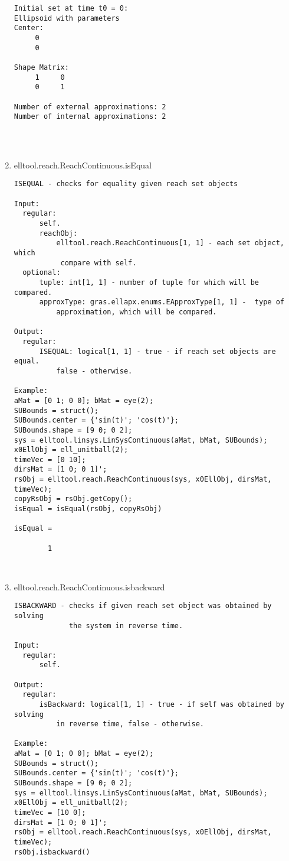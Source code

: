 \begin{enumerate}
\begin{lstlisting}
Initial set at time t0 = 0:
Ellipsoid with parameters
Center:
     0
     0

Shape Matrix:
     1     0
     0     1

Number of external approximations: 2
Number of internal approximations: 2




\end{lstlisting}
\fontfamily{\familydefault}
\selectfont
\item {elltool.reach.ReachContinuous.isEqual}
\selectfont
\begin{lstlisting}
ISEQUAL - checks for equality given reach set objects

Input:
  regular:
      self.
      reachObj:
          elltool.reach.ReachContinuous[1, 1] - each set object, which
           compare with self.
  optional:
      tuple: int[1, 1] - number of tuple for which will be compared.
      approxType: gras.ellapx.enums.EApproxType[1, 1] -  type of
          approximation, which will be compared.

Output:
  regular:
      ISEQUAL: logical[1, 1] - true - if reach set objects are equal.
          false - otherwise.

Example:
aMat = [0 1; 0 0]; bMat = eye(2);
SUBounds = struct();
SUBounds.center = {'sin(t)'; 'cos(t)'};
SUBounds.shape = [9 0; 0 2];
sys = elltool.linsys.LinSysContinuous(aMat, bMat, SUBounds);
x0EllObj = ell_unitball(2);
timeVec = [0 10];
dirsMat = [1 0; 0 1]';
rsObj = elltool.reach.ReachContinuous(sys, x0EllObj, dirsMat, timeVec);
copyRsObj = rsObj.getCopy();
isEqual = isEqual(rsObj, copyRsObj)

isEqual =

        1



\end{lstlisting}
\fontfamily{\familydefault}
\selectfont
\item {elltool.reach.ReachContinuous.isbackward}
\selectfont
\begin{lstlisting}
ISBACKWARD - checks if given reach set object was obtained by solving
             the system in reverse time.

Input:
  regular:
      self.

Output:
  regular:
      isBackward: logical[1, 1] - true - if self was obtained by solving
          in reverse time, false - otherwise.

Example:
aMat = [0 1; 0 0]; bMat = eye(2);
SUBounds = struct();
SUBounds.center = {'sin(t)'; 'cos(t)'};
SUBounds.shape = [9 0; 0 2];
sys = elltool.linsys.LinSysContinuous(aMat, bMat, SUBounds);
x0EllObj = ell_unitball(2);
timeVec = [10 0];
dirsMat = [1 0; 0 1]';
rsObj = elltool.reach.ReachContinuous(sys, x0EllObj, dirsMat, timeVec);
rsObj.isbackward()


\end{lstlisting}
\end{enumerate}
